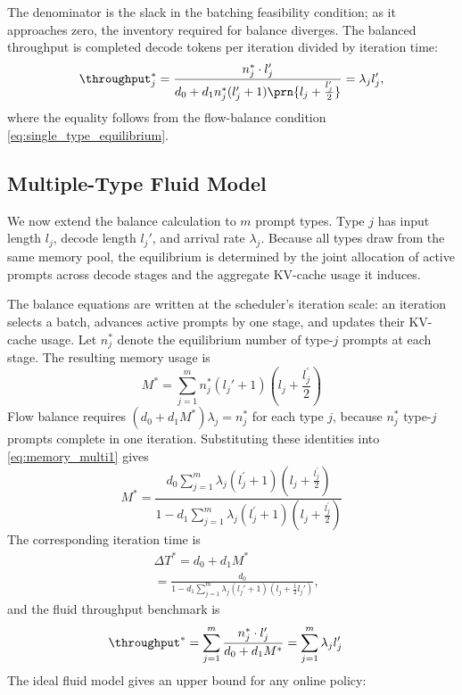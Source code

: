 The denominator is the slack in the batching feasibility condition; as it approaches zero, the inventory required for balance diverges. The balanced throughput is completed decode tokens per iteration divided by iteration time:
\begin{equation}\label{eq:throughput_fluid}
\throughput_j^* = \frac{n_j^* \cdot l_j'}{d_0+d_1n_j^*(l_j'+1)\prn{l_j+\frac{l_j'}{2}}} = \lambda_j l_j',
\end{equation}
where the equality follows from the flow-balance condition \eqref{eq:single_type_equilibrium}.

\subsection{Multiple-Type Fluid Model}
We now extend the balance calculation to \(m\) prompt types. Type \(j\) has input length \(l_j\), decode length \(l_j'\), and arrival rate \(\lambda_j\). Because all types draw from the same memory pool, the equilibrium is determined by the joint allocation of active prompts across decode stages and the aggregate KV-cache usage it induces.

The balance equations are written at the scheduler's iteration scale: an iteration selects a batch, advances active prompts by one stage, and updates their KV-cache usage. Let \(n_j^*\) denote the equilibrium number of type-\(j\) prompts at each stage. The resulting memory usage is
\begin{equation}
\label{eq:memory_multi1}
    M^* = \sum_{j=1}^m n_j^*(l_j'+1)\left(l_j + \frac{l_j^\prime}{2}\right)
\end{equation}
Flow balance requires \((d_0+d_1M^*)\lambda_j = n_j^*\) for each type \(j\), because \(n_j^*\) type-\(j\) prompts complete in one iteration. Substituting these identities into \eqref{eq:memory_multi1} gives
\begin{equation}
\label{eq:memory_multi2}
M^* = \frac{d_0\sum_{j=1}^m \lambda_j (l_j^{\prime}+1)\left(l_j + \frac{l_j^{\prime}}{2} \right)}{1-d_1\sum_{j=1}^m \lambda_j (l_j^{\prime}+1)\left(l_j + \frac{l_j^{\prime}}{2} \right) } 
\end{equation}
The corresponding iteration time is
\begin{equation}    \label{eq:time_fluid}
    \begin{aligned}
            &\Delta T^* = d_0 + d_1 M^*  \\
                  &= \frac{d_0}{1 - d_1 \sum_{j=1}^m \lambda_j (l_j' + 1)(l_j + \tfrac{1} {2}l_j')},
    \end{aligned}
\end{equation}
and the fluid throughput benchmark is
\begin{equation}
    \label{throughput_fluid_multiple}
    \begin{aligned}
        &\throughput^*
        = \sum_{j=1}^m \frac{n_j^* \cdot l_j^{\prime}}{d_0 + d_1 M^*}
        = \sum_{j=1}^m \lambda_j l_j^{\prime}
    \end{aligned}
\end{equation}
The ideal fluid model gives an upper bound for any online policy:


